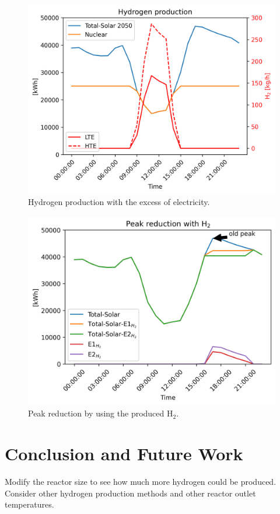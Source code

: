 \documentclass{anstrans}
\begin{document}
\begin{figure}[H]
	\centering
	\includegraphics[width=1.0\linewidth]{figures/uiuc-hydro2.png}
	\hfill
	\caption{Hydrogen production with the excess of electricity.}
	\label{fig:uiuc-hydro2}
\end{figure}

\begin{figure}[H]
	\centering
	\includegraphics[width=1.0\linewidth]{figures/uiuc-hydro3.png}
	\hfill
	\caption{Peak reduction by using the produced H$_2$.}
	\label{fig:uiuc-hydro3}
\end{figure}

\section{Conclusion and Future Work}

Modify the reactor size to see how much more hydrogen could be produced.
Consider other hydrogen production methods and other reactor outlet temperatures.




\end{document}
